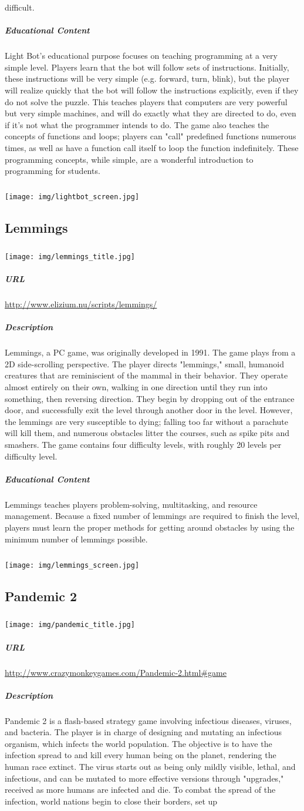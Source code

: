 difficult.\subparagraph{Educational Content}Light Bot's educational purpose focuses on teaching programming at a very simple level. Players learn that the bot will follow sets of instructions. Initially, these instructions will be very simple (e.g. forward, turn, blink), but the player will realize quickly that the bot will follow the instructions explicitly, even if they do not solve the puzzle. This teaches players that computers are very powerful but very simple machines, and will do exactly what they are directed to do, even if it's not what the programmer intends to do. The game also teaches the concepts of functions and loops; players can "call" predefined functions numerous times, as well as have a function call itself to loop the function indefinitely. These programming concepts, while simple, are a wonderful introduction to programming for students. \subparagraph{}\texttt{[image: img/lightbot\_screen.jpg]}\subsection{Lemmings}\subparagraph{}\texttt{[image: img/lemmings\_title.jpg]}\subparagraph{URL}\url{http://www.elizium.nu/scripts/lemmings/}\subparagraph{Description}Lemmings, a PC game, was originally developed in 1991. The game plays from a 2D side-scrolling perspective. The player directs "lemmings," small, humanoid creatures that are reminiscient of the mammal in their behavior. They operate almost entirely on their own, walking in one direction until they run into something, then reversing direction. They begin by dropping out of the entrance door, and successfully exit the level through another door in the level. However, the lemmings are very susceptible to dying; falling too far without a parachute will kill them, and numerous obstacles litter the courses, such as spike pits and smashers. The game contains four difficulty levels, with roughly 20 levels per difficulty level.\subparagraph{Educational Content}Lemmings teaches players problem-solving, multitasking, and resource management. Because a fixed number of lemmings are required to finish the level, players must learn the proper methods for getting around obstacles by using the minimum number of lemmings possible.\subparagraph{}\texttt{[image: img/lemmings\_screen.jpg]}\subsection{Pandemic 2}\subparagraph{}\texttt{[image: img/pandemic\_title.jpg]}\subparagraph{URL}\url{http://www.crazymonkeygames.com/Pandemic-2.html#game}\subparagraph{Description}Pandemic 2 is a flash-based strategy game involving infectious diseases, viruses, and bacteria. The player is in charge of designing and mutating an infectious organism, which infects the world population. The objective is to have the infection spread to and kill every human being on the planet, rendering the human race extinct. The virus starts out as being only mildly visible, lethal, and infectious, and can be mutated to more effective versions through "upgrades," received as more humans are infected and die. To combat the spread of the infection, world nations begin to close their borders, set up 